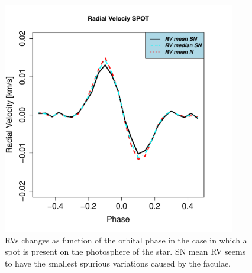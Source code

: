 \documentclass[11pt, oneside]{article}
\begin{document}
\begin{figure}[htbp]
   \centering
\includegraphics[height = 4in]{RV_comparison_SPOT.pdf} 
\caption{RVs changes as function of the orbital phase in the case in which a spot is present on the photosphere of the star. SN mean RV seems to have the smallest spurious variations caused by the faculae.}
    \label{fig:spot}
\end{figure}
\end{document}
